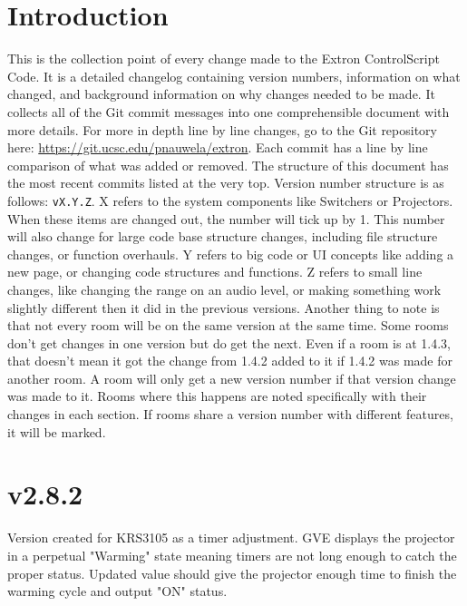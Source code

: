\documentclass{article}
\title{\TITLE}
\author{\NAME}
\date{\OFFICE}
\begin{document}
\pagestyle{fancy}
\fancyfoot{}
\fancyhead{}
\fancyfoot[L]{\TITLE\ -- \OFFICE}
\fancyfoot[R]{\thepage}

\maketitle

\section*{Introduction}\label{sec:Intro}

This is the collection point of every change made to the Extron ControlScript Code. It is a detailed changelog containing version numbers, information on what changed, and background information on why changes needed to be made. It collects all of the Git commit messages into one comprehensible document with more details. For more in depth line by line changes, go to the Git repository here: \url{https://git.ucsc.edu/pnauwela/extron}. Each commit has a line by line comparison of what was added or removed. The structure of this document has the most recent commits listed at the very top. Version number structure is as follows: \lstinline|vX.Y.Z|. X refers to the system components like Switchers or Projectors. When these items are changed out, the number will tick up by 1. This number will also change for large code base structure changes, including file structure changes, or function overhauls. Y refers to big code or UI concepts like adding a new page, or changing code structures and functions. Z refers to small line changes, like changing the range on an audio level, or making something work slightly different then it did in the previous versions. Another thing to note is that not every room will be on the same version at the same time. Some rooms don't get changes in one version but do get the next. Even if a room is at 1.4.3, that doesn't mean it got the change from 1.4.2 added to it if 1.4.2 was made for another room. A room will only get a new version number if that version change was made to it. Rooms where this happens are noted specifically with their changes in each section. If rooms share a version number with different features, it will be marked. 

\section*{v2.8.2}

Version created for KRS3105 as a timer adjustment. GVE displays the projector in a perpetual "Warming" state meaning timers are not long enough to catch the proper status. Updated value should give the projector enough time to finish the warming cycle and output "ON" status. 
\end{document}
